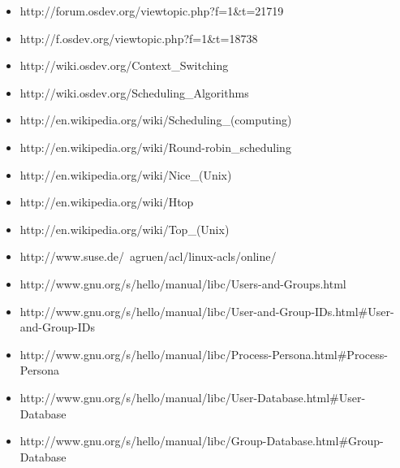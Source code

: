 \documentclass[a4paper,10pt]{article}
\begin{document}
\begin{itemize}
  \item http://forum.osdev.org/viewtopic.php?f=1\&t=21719
  \item http://f.osdev.org/viewtopic.php?f=1\&t=18738
  \item http://wiki.osdev.org/Context\_Switching
  \item http://wiki.osdev.org/Scheduling\_Algorithms
  \item http://en.wikipedia.org/wiki/Scheduling\_(computing)
  \item http://en.wikipedia.org/wiki/Round-robin\_scheduling
  \item http://en.wikipedia.org/wiki/Nice\_(Unix)
  \item http://en.wikipedia.org/wiki/Htop
  \item http://en.wikipedia.org/wiki/Top\_(Unix)
  \item http://www.suse.de/~agruen/acl/linux-acls/online/
  \item http://www.gnu.org/s/hello/manual/libc/Users-and-Groups.html
  \item http://www.gnu.org/s/hello/manual/libc/User-and-Group-IDs.html\#User-and-Group-IDs
  \item http://www.gnu.org/s/hello/manual/libc/Process-Persona.html\#Process-Persona
  \item http://www.gnu.org/s/hello/manual/libc/User-Database.html\#User-Database
  \item http://www.gnu.org/s/hello/manual/libc/Group-Database.html\#Group-Database
\end{itemize}
   
\end{document}
